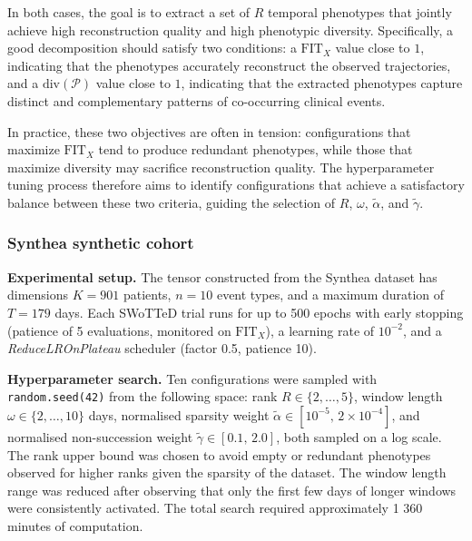 \documentclass[pdflatex,sn-mathphys-num,referee,lineno]{sn-jnl}
\begin{document}
In both cases, the goal is to extract a set of $R$ temporal phenotypes that jointly achieve high reconstruction quality and high phenotypic diversity.
Specifically, a good decomposition should satisfy two conditions: a $\text{FIT}_X$ value close to $1$, indicating that the phenotypes accurately reconstruct the observed trajectories, and a $\text{div}(\mathcal{P})$ value close to $1$, indicating that the extracted phenotypes capture distinct and complementary patterns of co-occurring clinical events.

In practice, these two objectives are often in tension: configurations that maximize $\text{FIT}_X$ tend to produce redundant phenotypes, while those that maximize diversity may sacrifice reconstruction quality.
The hyperparameter tuning process therefore aims to identify configurations that achieve a satisfactory balance between these two criteria, guiding the selection of $R$, $\omega$, $\tilde{\alpha}$, and $\tilde{\gamma}$.

\subsubsection{Synthea synthetic cohort}\label{sec:synthea_res}

\textbf{Experimental setup.}
The tensor constructed from the Synthea dataset has dimensions $K = 901$ patients, $n = 10$ event types, and a maximum duration of $T = 179$ days.
Each SWoTTeD trial runs for up to 500 epochs with early stopping (patience of 5 evaluations, monitored on $\text{FIT}_X$), a learning rate of $10^{-2}$, and a \emph{ReduceLROnPlateau} scheduler (factor 0.5, patience 10).

\textbf{Hyperparameter search.}
Ten configurations were sampled with \texttt{random.seed(42)} from the following space: rank $R \in \{2, \ldots, 5\}$, window length $\omega \in \{2, \ldots, 10\}$ days, normalised sparsity weight $\tilde{\alpha} \in [10^{-5},\, 2 \times 10^{-4}]$,
and normalised non-succession weight $\tilde{\gamma} \in [0.1,\, 2.0]$, both sampled on a log scale.
The rank upper bound was chosen to avoid empty or redundant phenotypes observed for higher ranks given the sparsity of the dataset.
The window length range was reduced after observing that only the first few days of longer windows were consistently activated.
The total search required approximately 1 360 minutes of computation.
\end{document}
